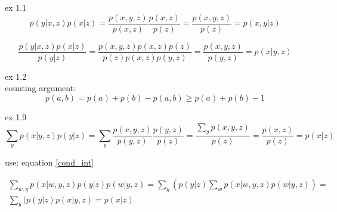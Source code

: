 \documentclass[12pt]{article}
\begin{document}
ex 1.1
\begin{equation}
p(y|x,z)p(x|z) = \frac{p(x,y,z)}{p(x,z)} \frac {p(x,z)}{p(z)} = \frac{p(x,y,z)}{p(z)} = p(x,y|z)
\end{equation}


\begin{equation}
\frac{p(y|x,z)p(x|z)}{p(y|z)} = \frac{p(x,y,z)p(x,z)p(z)}{p(z)p(x,z)p(y,z)} = \frac{p(x,y,z)}{p(y,z)} = p(x|y,z)
\end{equation}


ex 1.2\\
counting argument:
\begin{equation}
p(a,b) = p(a) + p(b) - p(a,b) \geq p(a) + p(b) - 1
\end{equation}


ex 1.9
\begin{equation}
\label{cond_int}
\sum_{y} {p(x|y,z)p(y|z)} = \sum_{y}{\frac{p(x,y,z)}{p(y,z)}\frac{p(y,z)}{p(z)}} = \frac{\sum_{y}{p(x,y,z)}}{p(z)} = \frac{p(x,z)}{p(z)} = p(x|z)
\end{equation}

use: equation \ref{cond_int}

\begin{equation}
\begin{split}
\sum_{w,y}{p(x|w,y,z)p(y|z)p(w|y,z)} = \sum_{y}{(p(y|z)\sum_{w}{p(x|w,y,z)p(w|y,z)})} =\\
\sum_{y}{(p(y|z)p(x|y,z)} = p(x|z)
\end{split}

\end{equation}
\end{document}
